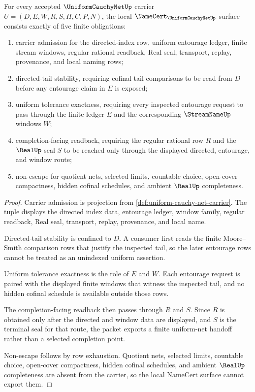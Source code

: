 \begin{theorem}
\label{thm:uniform-cauchy-net-namecert-obligations}
For every accepted $\UniformCauchyNetUp$ carrier $U=(D,E,W,R,S,H,C,P,N)$, the local $\NameCert_{\UniformCauchyNetUp}$ surface consists exactly of five finite obligations:
\begin{enumerate}
\item carrier admission for the directed-index row, uniform entourage ledger, finite stream windows, regular rational readback, Real seal, transport, replay, provenance, and local naming rows;
\item directed-tail stability, requiring cofinal tail comparisons to be read from $D$ before any entourage claim in $E$ is exposed;
\item uniform tolerance exactness, requiring every inspected entourage request to pass through the finite ledger $E$ and the corresponding $\StreamNameUp$ windows $W$;
\item completion-facing readback, requiring the regular rational row $R$ and the $\RealUp$ seal $S$ to be reached only through the displayed directed, entourage, and window route;
\item non-escape for quotient nets, selected limits, countable choice, open-cover compactness, hidden cofinal schedules, and ambient $\RealUp$ completeness.
\end{enumerate}
\end{theorem}
\begin{proof}
Carrier admission is projection from \autoref{def:uniform-cauchy-net-carrier}. The tuple displays the directed index data, entourage ledger, window family, regular readback, Real seal, transport, replay, provenance, and local name.

Directed-tail stability is confined to $D$. A consumer first reads the finite Moore--Smith comparison rows that justify the inspected tail, so the later entourage rows cannot be treated as an unindexed uniform assertion.

Uniform tolerance exactness is the role of $E$ and $W$. Each entourage request is paired with the displayed finite windows that witness the inspected tail, and no hidden cofinal schedule is available outside those rows.

The completion-facing readback then passes through $R$ and $S$. Since $R$ is obtained only after the directed and window data are displayed, and $S$ is the terminal seal for that route, the packet exports a finite uniform-net handoff rather than a selected completion point.

Non-escape follows by row exhaustion. Quotient nets, selected limits, countable choice, open-cover compactness, hidden cofinal schedules, and ambient $\RealUp$ completeness are absent from the carrier, so the local NameCert surface cannot export them.
\end{proof}


